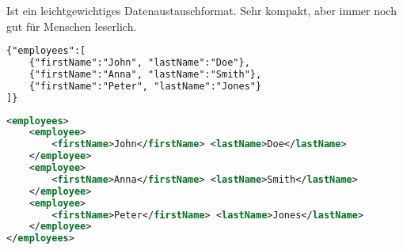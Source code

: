 Ist ein leichtgewichtiges Datenaustauschformat. Sehr kompakt, aber immer noch gut für Menschen leserlich.

\begin{minipage}{0.45\textwidth}
\begin{lstlisting}[language=XML, caption={JSON Example}]
{"employees":[
    {"firstName":"John", "lastName":"Doe"},
    {"firstName":"Anna", "lastName":"Smith"},
    {"firstName":"Peter", "lastName":"Jones"}
]}
\end{lstlisting}
\end{minipage}
\hfill
\begin{minipage}{0.45\textwidth}
\begin{lstlisting}[language=XML, caption={XML Example}]
<employees>
    <employee>
        <firstName>John</firstName> <lastName>Doe</lastName>
    </employee>
    <employee>
        <firstName>Anna</firstName> <lastName>Smith</lastName>
    </employee>
    <employee>
        <firstName>Peter</firstName> <lastName>Jones</lastName>
    </employee>
</employees>
\end{lstlisting}
\end{minipage}\\